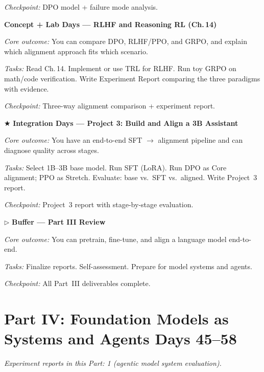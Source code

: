 \begin{description}[style=nextline, leftmargin=1.8cm, labelwidth=1.5cm]
\textit{Checkpoint:} DPO model + failure mode analysis.

\item[Day 38--40] \textbf{Concept + Lab Days --- RLHF and Reasoning RL (Ch.\,14)}

\textit{Core outcome:} You can compare DPO, RLHF/PPO, and GRPO, and explain which alignment approach fits which scenario.

\textit{Tasks:} Read Ch.\,14. Implement or use TRL for RLHF. Run toy GRPO on math/code verification. Write Experiment Report comparing the three paradigms with evidence.

\textit{Checkpoint:} Three-way alignment comparison + experiment report.

\item[Day 41--43] $\bigstar$ \textbf{Integration Days --- Project 3: Build and Align a 3B Assistant}

\textit{Core outcome:} You have an end-to-end SFT $\rightarrow$ alignment pipeline and can diagnose quality across stages.

\textit{Tasks:} Select 1B--3B base model. Run SFT (LoRA). Run DPO as Core alignment; PPO as Stretch. Evaluate: base vs.\ SFT vs.\ aligned. Write Project~3 report.

\textit{Checkpoint:} Project~3 report with stage-by-stage evaluation.

\item[Day 44] $\triangleright$ \textbf{Buffer --- Part III Review}

\textit{Core outcome:} You can pretrain, fine-tune, and align a language model end-to-end.

\textit{Tasks:} Finalize reports. Self-assessment. Prepare for model systems and agents.

\textit{Checkpoint:} All Part~III deliverables complete.

\end{description}

\section*{Part IV: Foundation Models as Systems and Agents \hfill Days 45--58}

\medskip
\noindent\textit{Experiment reports in this Part: 1 (agentic model system evaluation).}

